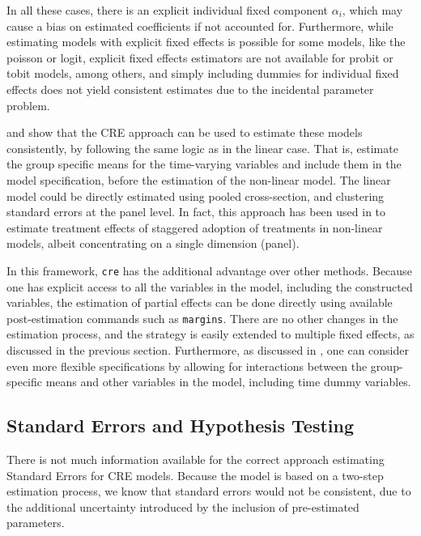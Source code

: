\documentclass[bib]{statapress}
\begin{document}
In all these cases, there is an explicit individual fixed component
\(\alpha_i\), which may cause a bias on estimated coefficients if not
accounted for. Furthermore, while estimating models with explicit fixed
effects is possible for some models, like the poisson or logit, explicit
fixed effects estimators are not available for probit or tobit models,
among others, and simply including dummies for individual fixed effects
does not yield consistent estimates due to the incidental parameter
problem.

\citet{wooldridge2019} and \citet{wooldridge2010econometric} show that
the CRE approach can be used to estimate these models consistently, by
following the same logic as in the linear case. That is, estimate the
group specific means for the time-varying variables and include them in
the model specification, before the estimation of the non-linear model.
The linear model could be directly estimated using pooled cross-section,
and clustering standard errors at the panel level. In fact, this
approach has been used in \citet{wooldridge2023} to estimate treatment
effects of staggered adoption of treatments in non-linear models, albeit
concentrating on a single dimension (panel).

In this framework, \texttt{cre} has the additional advantage over other
methods. Because one has explicit access to all the variables in the
model, including the constructed variables, the estimation of partial
effects can be done directly using available post-estimation commands
such as \texttt{margins}. There are no other changes in the estimation
process, and the strategy is easily extended to multiple fixed effects,
as discussed in the previous section. Furthermore, as discussed in
\citet{wooldridge2019}, one can consider even more flexible
specifications by allowing for interactions between the group-specific
means and other variables in the model, including time dummy variables.

\subsection{Standard Errors and Hypothesis
Testing}\label{standard-errors-and-hypothesis-testing}

There is not much information available for the correct approach
estimating Standard Errors for CRE models. Because the model is based on
a two-step estimation process, we know that standard errors would not be
consistent, due to the additional uncertainty introduced by the
inclusion of pre-estimated parameters.
\end{document}
